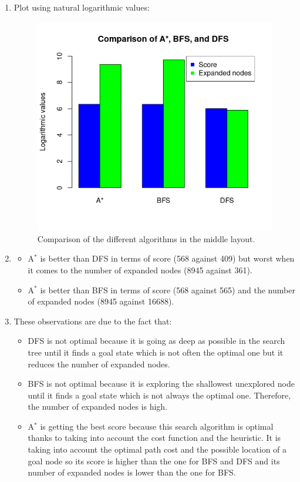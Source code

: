 \documentclass{article}
\begin{document}
\begin{enumerate}[label=\alph*.,leftmargin=1.35em]
    \item Plot using natural logarithmic values:\\
    \begin{figure}[H]
        \centering
        \includegraphics[scale=0.7]{q4_plot.png} 
        \caption{Comparison of the different algorithms in the middle layout.}
    \end{figure}
    \item
        \begin{itemize}
            \item A$^*$ is better than DFS in terms of score (568 against 409) but worst when it comes to the number of expanded nodes (8945 against 361).
            \item A$^*$ is better than BFS in terms of score (568 against 565) and the number of expanded nodes (8945 against 16688).
        \end{itemize}
    \item These observations are due to the fact that:
        \begin{itemize}
            \item DFS is not optimal because it is going as deep as possible in the search tree until it finds a goal state which is not often the optimal one but it reduces the number of expanded nodes.
            \item BFS is not optimal because it is exploring the shallowest unexplored node until it finds a goal state which is not always the optimal one. Therefore, the number of expanded nodes is high.
            \item A$^*$ is getting the best score because this search algorithm is optimal thanks to taking into account the cost function and the heuristic. It is taking into account the optimal path cost and the possible location of a goal node so its score is higher than the one for BFS and DFS and its number of expanded nodes is lower than the one for BFS.
        \end{itemize}
\end{enumerate}


\end{document}
